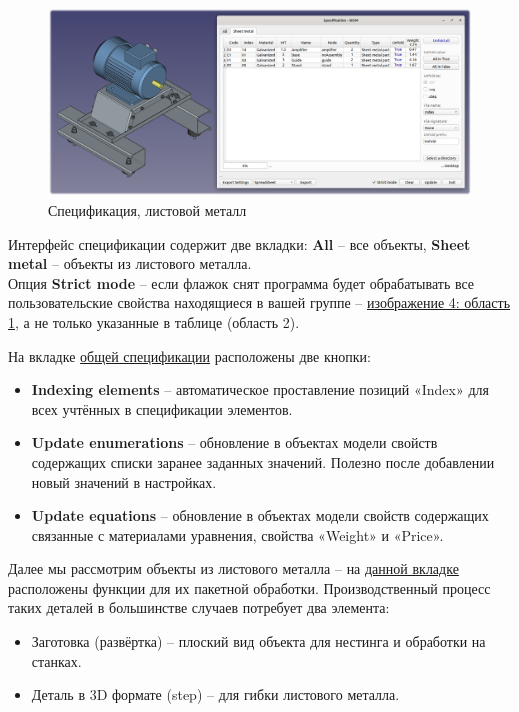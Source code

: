 \documentclass[a4paper,12pt]{article}
\begin{document}
\begin{figure}[htp]
	\centering
	\includegraphics[width=1\textwidth]{img/specification_sm.png}
	\caption{Спецификация, листовой металл}
	\label{sec:specification_sm}
\end{figure}


Интерфейс спецификации содержит две вкладки: \textbf{All} -- все объекты, \textbf{Sheet metal} -- объекты из листового металла.\\

Опция \textbf{Strict mode} -- если флажок снят программа будет обрабатывать все пользовательские свойства находящиеся в вашей группе -- \hyperref[sec:pref_specification]{изображение 4: область 1}, а не только указанные в таблице (область 2).

\pagebreak


На вкладке \hyperref[sec:specification_all]{общей спецификации} расположены две кнопки:
\begin{itemize}
	\item \textbf{Indexing elements} -- автоматическое проставление позиций «Index» для всех учтённых в спецификации элементов.
	\item \textbf{Update enumerations} -- обновление в объектах модели свойств содержащих списки заранее заданных значений. Полезно после добавлении новый значений в настройках.
	\item \textbf{Update equations} -- обновление в объектах модели свойств содержащих связанные с материалами уравнения, свойства «Weight» и «Price».\\
\end{itemize}

Далее мы рассмотрим объекты из листового металла -- на \hyperref[sec:specification_sm]{данной вкладке} расположены функции для их пакетной обработки. Производственный процесс таких деталей в большинстве случаев потребует два элемента:
\begin{itemize}
	\item Заготовка (развёртка) -- плоский вид объекта для нестинга и обработки на станках.
	\item Деталь в 3D формате (step) -- для гибки листового металла.
\end{itemize}
\end{document}
